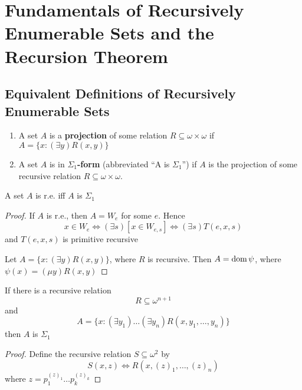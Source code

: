 \documentclass[11pt]{article}
\begin{document}
\section{Fundamentals of Recursively Enumerable Sets and the Recursion Theorem}
\label{sec:org950e418}
\subsection{Equivalent Definitions of Recursively Enumerable Sets}
\label{sec:org3f94a40}
\begin{definition}[]
\begin{enumerate}
\item A set \(A\) is a \textbf{projection} of some relation
\(R\subseteq\omega\times\omega\) if \(A=\{x:(\exists y)R(x,y)\}\)
\item A set \(A\) is in \textbf{\(\Sigma_1\)-form} (abbreviated ``A is \(\Sigma_1\)'') if
\(A\) is the projection of some recursive relation \(R\subseteq\omega\times\omega\).
\end{enumerate}
\end{definition}

\begin{theorem}
\label{thm2.1.2}
A set \(A\) is r.e. iff \(A\) is \(\Sigma_1\)
\end{theorem}

\begin{proof}
If \(A\) is r.e., then \(A=W_e\) for some \(e\). Hence
\begin{equation*}
x\in W_e\Leftrightarrow(\exists s)[x\in W_{e,s}]\Leftrightarrow
(\exists s)T(e,x,s)
\end{equation*}
and \(T(e,x,s)\) is primitive recursive

Let \(A=\{x:(\exists y)R(x,y)\}\), where \(R\) is recursive. Then
\(A=\operatorname{dom}\psi\), where \(\psi(x)=(\mu y)R(x,y)\)
\end{proof}

\begin{theorem}
\label{thm2.1.3}
If there is a recursive relation
\begin{equation*}
R\subseteq\omega^{n+1}
\end{equation*}
and
\begin{equation*}
A=\{x:(\exists y_1)\dots(\exists y_n)R(x,y_1,\dots,y_n)\}
\end{equation*}
then \(A\) is \(\Sigma_1\)
\end{theorem}

\begin{proof}
Define the recursive relation \(S\subseteq \omega^2\) by
\begin{equation*}
S(x,z)\Leftrightarrow R(x,(z)_1,\dots,(z)_n)
\end{equation*}
where \(z=p_1^{(z)_1}\dots p_k^{(z)_k}\)
\end{proof}
\end{document}
